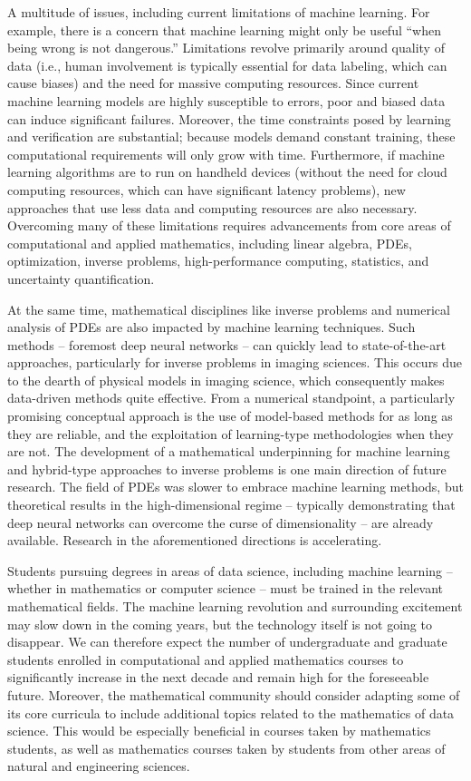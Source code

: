 A multitude of issues, including current limitations of machine learning. For example, there is a concern that machine learning might only be useful ``when being wrong is not dangerous.''   Limitations revolve primarily around quality of data (i.e., human involvement is typically essential for data labeling, which can cause biases) and the need for massive computing resources. Since current machine learning models are highly susceptible to errors, poor and biased data can induce significant failures. Moreover, the time constraints posed by learning and verification are substantial; because models demand constant training, these computational requirements will only grow with time. Furthermore, if machine learning algorithms are to run on handheld devices (without the need for cloud computing resources, which can have significant latency problems), new approaches that use less data and computing resources are also necessary. Overcoming many of these limitations requires advancements from core areas of computational and applied mathematics, including linear algebra, PDEs, optimization, inverse problems, high-performance computing, statistics, and uncertainty quantification.

At the same time, mathematical disciplines like inverse problems and numerical analysis of PDEs are also impacted by machine learning techniques. Such methods -- foremost deep neural networks -- can quickly lead to state-of-the-art approaches, particularly for inverse problems in imaging sciences. This occurs due to the dearth of physical models in imaging science, which consequently makes data-driven methods quite effective. From a numerical standpoint, a particularly promising conceptual approach is the use of model-based methods for as long as they are reliable, and the exploitation of learning-type methodologies when they are not. The development of a mathematical underpinning for machine learning and hybrid-type approaches to inverse problems is one main direction of future research. The field of PDEs was slower to embrace machine learning methods, but theoretical results in the high-dimensional regime -- typically demonstrating that deep neural networks can overcome the curse of dimensionality -- are already available. Research in the aforementioned directions is accelerating.

Students pursuing degrees in areas of data science, including machine learning -- whether in mathematics or computer science -- must be trained in the relevant mathematical fields. The machine learning revolution and surrounding excitement may slow down in the coming years, but the technology itself is not going to disappear. We can therefore expect the number of undergraduate and graduate students enrolled in computational and applied mathematics courses to significantly increase in the next decade and remain high for the foreseeable future. Moreover, the mathematical community should consider adapting some of its core curricula to include additional topics related to the mathematics of data science. This would be especially beneficial in courses taken by mathematics students, as well as mathematics courses taken by students from other areas of natural and engineering sciences.

